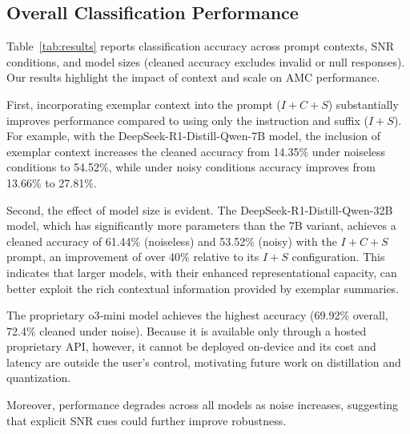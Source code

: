 \subsection{Overall Classification Performance}
{{Table~\ref{tab:results} reports classification accuracy across prompt contexts, SNR conditions, and model sizes (cleaned accuracy excludes invalid or null responses). Our results highlight the impact of context and scale on AMC performance.}}


First, incorporating exemplar context into the prompt ($I+C+S$) substantially improves performance compared to using only the instruction and suffix ($I+S$). For example, with the DeepSeek-R1-Distill-Qwen-7B model, the inclusion of exemplar context increases the cleaned accuracy from 14.35\% under noiseless conditions to 54.52\%, while under noisy conditions accuracy improves from 13.66\% to 27.81\%.

Second, the effect of model size is evident. The DeepSeek-R1-Distill-Qwen-32B model, which has significantly more parameters than the 7B variant, achieves a cleaned accuracy of 61.44\% (noiseless) and 53.52\% (noisy) with the $I+C+S$ prompt, an improvement of over 40\% relative to its $I+S$ configuration. This indicates that larger models, with their enhanced representational capacity, can better exploit the rich contextual information provided by exemplar summaries.


{{The proprietary o3‑mini model achieves the highest accuracy (69.92\% overall, 72.4\% cleaned under noise). Because it is available only through a hosted proprietary API, however, it cannot be deployed on-device and its cost and latency are outside the user's control, motivating future work on distillation and quantization.}}

{{Moreover, performance degrades across all models as noise increases, suggesting that explicit SNR cues could further improve robustness.}}


